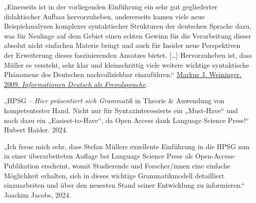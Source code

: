 {\medskip

\noindent
„Einerseits ist in der vorliegenden Einführung ein sehr gut gegliederter didaktischer Aufbau
hervorzuheben, andererseits kamen viele neue Beispielanalysen komplexer syntaktischer
Strukturen der deutschen Sprache dazu, was für Neulinge auf dem Gebiet einen echten Gewinn für die
Verarbeitung dieser absolut nicht einfachen Materie bringt und auch für Insider neue Perspektiven
der Erweiterung dieses faszinierenden Ansatzes bietet. [\ldots] Hervorzuheben ist, dass Müller es
versteht, sehr klar und kleinschrittig viele weitere wichtige syntaktische Phänomene des Deutschen
nachvollziehbar einzuführen.“ \href{https://doi.org/10.1515/infodaf-2009-2-361}{Markus J. Weininger. 2009. \emph{Informationen Deutsch als Fremdsprache}}. 


\medskip

\noindent

\noindent
„HPSG – \emph{Hier präsentiert sich Grammatik} in Theorie \& Anwendung von kompetentester
Hand. Nicht nur für Syntaxinteressierte ein „Must-Have“ und noch dazu ein „Easiest-to-Have“, da Open
Access dank Language Science Press!“ Hubert Haider. 2024.

\medskip

\noindent
„Ich freue mich sehr, dass Stefan Müllers exzellente Einführung  in die HPSG nun in einer
überarbeiteten Auflage bei Language Science Press als Open-Access-Publikation erscheint, womit
Studierende und Forscher/innen eine einfache Möglichkeit erhalten, sich in dieses wichtige
Grammatikmodell detailliert einzuarbeiten und über den neuesten Stand seiner Entwicklung zu
informieren.“ Joachim Jacobs, 2024.

}



\dedication{Ich widme dieses Buch Brigitte Narr als Dank für ihren unermüdlichen Einsatz für die
  Sprachwissenschaft.\\Sie gehört definitiv zu den Guten im Verlagswesen.}

\renewcommand{\lsDedicationFont}{\fontsize{15pt}{8mm}\selectfont}

\renewcommand{\lsSeries}{tbls} %

